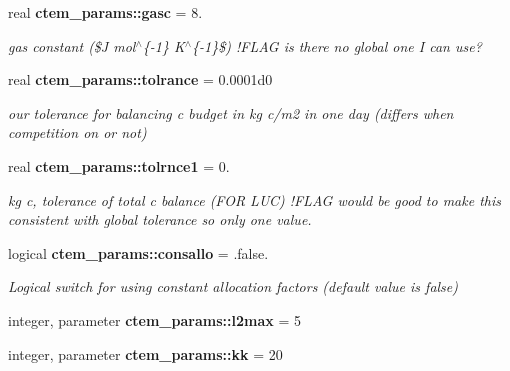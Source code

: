 \begin{DoxyCompactItemize}
\item 
\hypertarget{namespacectem__params_a69dfc8466b8603dc7ce853efe2fbeb27}{}real {\bfseries ctem\+\_\+params\+::gasc} = 8.\label{namespacectem__params_a69dfc8466b8603dc7ce853efe2fbeb27}

\begin{DoxyCompactList}\small\item\em gas constant (\$\+J mol$^\wedge$\{-\/1\} K$^\wedge$\{-\/1\}\$) !\+F\+L\+A\+G is there no global one I can use? \end{DoxyCompactList}\item 
\hypertarget{namespacectem__params_a0556fbcb62b10a6e390157c628d227d1}{}real {\bfseries ctem\+\_\+params\+::tolrance} = 0.\+0001d0\label{namespacectem__params_a0556fbcb62b10a6e390157c628d227d1}

\begin{DoxyCompactList}\small\item\em our tolerance for balancing c budget in kg c/m2 in one day (differs when competition on or not) \end{DoxyCompactList}\item 
\hypertarget{namespacectem__params_a1ecb947f804fa8a4db85cb4524c12957}{}real {\bfseries ctem\+\_\+params\+::tolrnce1} = 0.\label{namespacectem__params_a1ecb947f804fa8a4db85cb4524c12957}

\begin{DoxyCompactList}\small\item\em kg c, tolerance of total c balance (F\+O\+R L\+U\+C) !\+F\+L\+A\+G would be good to make this consistent with global tolerance so only one value. \end{DoxyCompactList}\item 
\hypertarget{namespacectem__params_a7fc44574a63fd52e0b2556ba693de814}{}logical {\bfseries ctem\+\_\+params\+::consallo} = .false.\label{namespacectem__params_a7fc44574a63fd52e0b2556ba693de814}

\begin{DoxyCompactList}\small\item\em Logical switch for using constant allocation factors (default value is false) \end{DoxyCompactList}\item 
\hypertarget{namespacectem__params_af57395876febe85e76b0403ab6a4e8ed}{}integer, parameter {\bfseries ctem\+\_\+params\+::l2max} = 5\label{namespacectem__params_af57395876febe85e76b0403ab6a4e8ed}

\item 
\hypertarget{namespacectem__params_a4b2eab1c298364048680641681921e56}{}integer, parameter {\bfseries ctem\+\_\+params\+::kk} = 20\label{namespacectem__params_a4b2eab1c298364048680641681921e56}


\end{DoxyCompactItemize}
